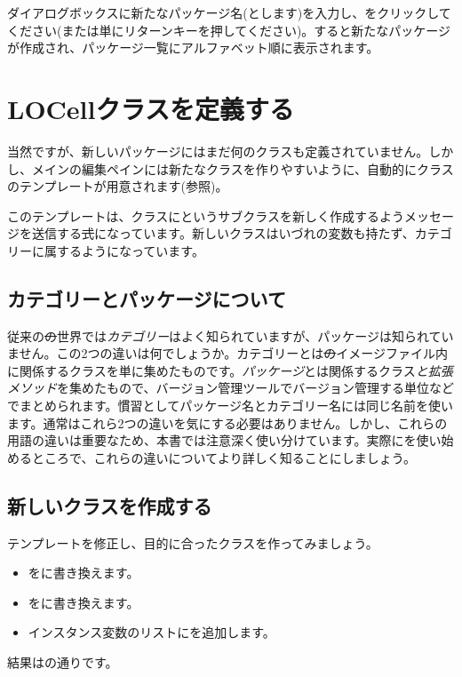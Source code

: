 \documentclass[a4paper,10pt,twoside]{book}
\begin{document}
ダイアログボックスに新たなパッケージ名(とします)を入力し、をクリックしてください(または単にリターンキーを押してください)。すると新たなパッケージが作成され、パッケージ一覧にアルファベット順に表示されます。

\section{LOCellクラスを定義する}

当然ですが、新しいパッケージにはまだ何のクラスも定義されていません。しかし、メインの編集ペインには新たなクラスを作りやすいように、自動的にクラスのテンプレートが用意されます(参照)。

このテンプレートは、クラスにというサブクラスを新しく作成するようメッセージを送信する\st 式になっています。新しいクラスはいづれの変数も持たず、カテゴリーに属するようになっています。

\subsection{カテゴリーとパッケージについて}

従来の\st の世界では\emph{カテゴリー}はよく知られていますが、パッケージは知られていません。この2つの違いは何でしょうか。カテゴリーとは\st のイメージファイル内に関係するクラスを単に集めたものです。\emph{パッケージ}とは関係するクラス\emph{と拡張メソッド}を集めたもので、バージョン管理ツールでバージョン管理する単位などでまとめられます。慣習としてパッケージ名とカテゴリー名には同じ名前を使います。通常はこれら2つの違いを気にする必要はありません。しかし、これらの用語の違いは重要なため、本書では注意深く使い分けています。実際にを使い始めるところで、これらの違いについてより詳しく知ることにしましょう。


\subsection{新しいクラスを作成する}

テンプレートを修正し、目的に合ったクラスを作ってみましょう。

\begin{itemize}
  \item {}をに書き換えます。
  \item {}をに書き換えます。
  \item インスタンス変数のリストにを追加します。
\end{itemize}
結果はの通りです。
\end{document}
